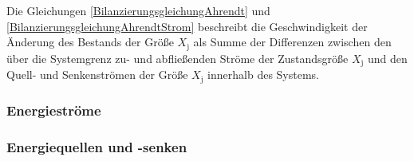 Die Gleichungen \eqref{BilanzierungsgleichungAhrendt} und \eqref{BilanzierungsgleichungAhrendtStrom} beschreibt die Geschwindigkeit der Änderung des 
Bestands der Größe \(X_{\text{j}}\) als Summe der Differenzen zwischen den über die Systemgrenz zu- und abfließenden Ströme der Zustandsgröße 
\(X_{\text{j}}\) und den Quell- und Senkenströmen der Größe \(X_{\text{j}}\) innerhalb des Systems. 



\subsubsection{Energieströme}

\subsubsection{Energiequellen und -senken}

